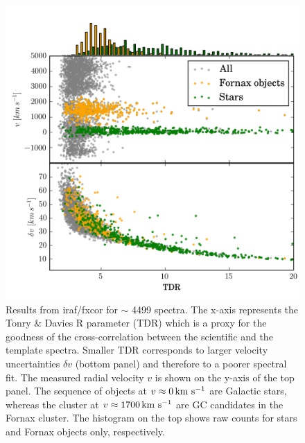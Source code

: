 \documentclass[useAMS,usenatbib]{mn2e}
\newcommand{\kms}{\mbox{\,km~s$^{-1}$}}
\begin{document}
\begin{figure}
\centering
\includegraphics[width=\columnwidth]{figures/fxcor_subplot.png} 
\caption{Results from iraf/fxcor for $\sim$ 4499 spectra. The x-axis represents the Tonry \& Davies R parameter (TDR) which is a proxy for the goodness of the cross-correlation between the scientific and the template spectra. Smaller TDR corresponds to larger velocity uncertainties $\delta v$ (bottom panel) and therefore to a poorer spectral fit. The measured radial velocity $v$ is shown on the y-axis of the top panel. The sequence of objects at $v\approx 0 \kms$ are Galactic stars, whereas the cluster at $v\approx1700\kms$ are GC candidates in the Fornax cluster. The histogram on the top shows raw counts for stars and Fornax objects only, respectively. }
\label{fig:tdr}
\end{figure}
\end{document}

